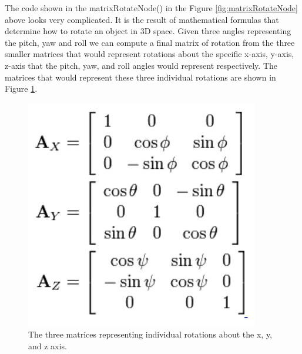The code shown in the matrixRotateNode() in the Figure \ref{fig:matrixRotateNode} above looks very complicated. It is the result of mathematical formulas that determine how to rotate an object in 3D space. Given three angles representing the pitch, yaw and roll we can compute a final matrix of rotation from the three smaller matrices that would represent rotations about the specific x-axis, y-axis, z-axis that the pitch, yaw, and roll angles would represent respectively. The matrices that would represent these three individual rotations are shown in Figure \ref{fig:threeMatrices}. 
\begin{figure}[H]
\centering
\includegraphics[scale=0.75]{Figures/4_threeSmallMatrices.JPG}
\caption[Single Rotation Matrices]{The three matrices representing individual rotations about the x, y, and z axis.}
\label{fig:threeMatrices}
\end{figure}

